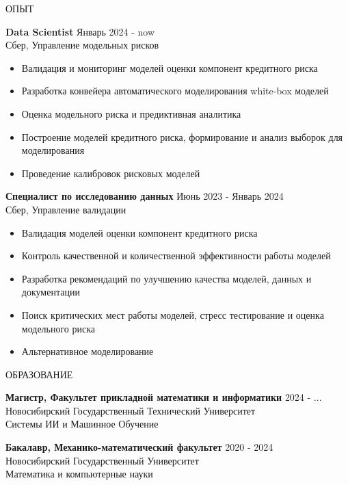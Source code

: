 \documentclass{resume} %
\begin{document}
\begin{rSection}{ОПЫТ}

\textbf{Data Scientist} \hfill Январь 2024 - now \\
Сбер, Управление модельных рисков %
 \begin{itemize}
    \itemsep -3pt {} 
     \item Валидация и мониторинг моделей оценки компонент кредитного риска
     \item Разработка конвейера автоматического моделирования white-box моделей
     \item Оценка модельного риска и предиктивная аналитика
     \item Построение моделей кредитного риска, формирование и анализ выборок для моделирования
     \item Проведение калибровок рисковых моделей
 \end{itemize}
 
\textbf{Специалист по исследованию данных} \hfill Июнь 2023 - Январь 2024\\
Сбер, Управление валидации %
 \begin{itemize}
    \itemsep -3pt {}
     \item Валидация моделей оценки компонент кредитного риска 
     \item Контроль качественной и количественной эффективности работы моделей
     \item Разработка рекомендаций по улучшению качества моделей, данных и документации
     \item Поиск критических мест работы моделей, стресс тестирование и оценка модельного риска
     \item Альтернативное моделирование
 \end{itemize}

\end{rSection} 
\begin{rSection}{ОБРАЗОВАНИЕ}

{\bf Магистр, Факультет прикладной математики и информатики} \hfill {2024 - ...} \\
Новосибирский Государственный Технический Университет \\
Системы ИИ и Машинное Обучение

{\bf Бакалавр, Механико-математический факультет} \hfill {2020 - 2024} \\
Новосибирский Государственный Университет \\
Математика и компьютерные науки

\end{rSection}
\end{document}
